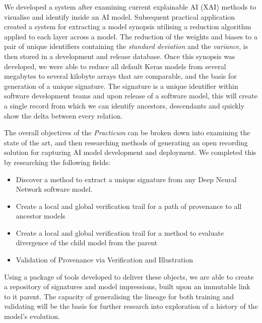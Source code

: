 We developed a system after examining current explainable AI (XAI) methods to visualise and identify inside an AI model. Subsequent practical application created a system for extracting a model synopsis utilising a reduction algorithm applied to each layer across a model. The reduction of the weights and biases to a pair of unique identifiers containing the \textit{standard deviation} and the \textit{variance}, is then stored in a development and release database. Once this synopsis was developed, we were able to reduce all default Keras models from several megabytes to several kilobyte arrays that are comparable, and the basis for generation of a unique signature. The signature is a unique identifier within software development teams and upon release of a software model, this will create a single record from which we can identify ancestors, descendants and quickly show the delta between every relation.

The overall objectives of the \textit{Practicum} can be broken down into examining the state of the art, and then researching methods of generating an open recording solution for capturing AI model development and deployment. We completed this by researching the following fields:

\begin{itemize}
    \item Discover a method to extract a unique signature from any Deep Neural Network software model.
    \item Create a local and global verification trail for a path of provenance to all ancestor models
    \item Create a local and global verification trail for a method to evaluate divergence of the child model from the parent
    \item Validation of Provenance via Verification and Illustration
\end{itemize}

Using a package of tools developed to deliver these objects, we are able to create a repository of signatures and model impressions, built upon an immutable link to it parent. The capacity of generalising the lineage for both training and validating will be the basis for further research into exploration of a history of the model's evolution.